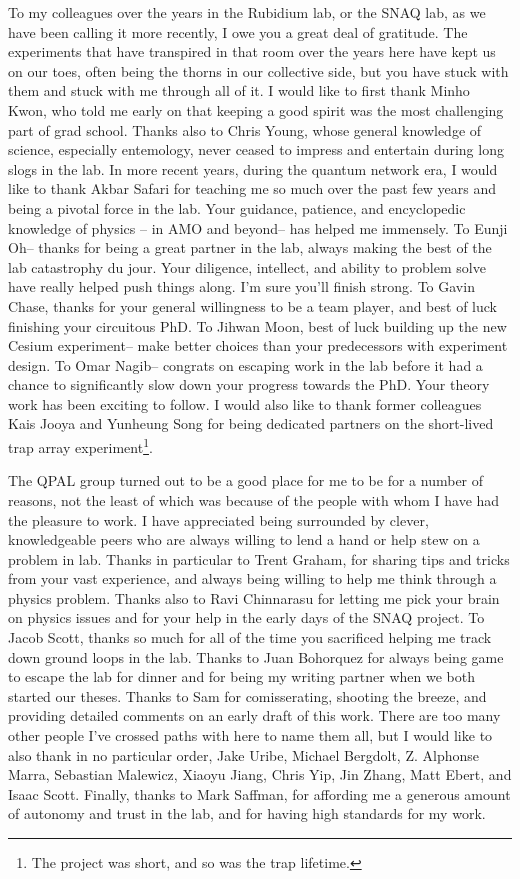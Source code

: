To my colleagues over the years in the Rubidium lab, or the SNAQ lab, as we have been calling it more recently, I owe you a great deal of gratitude. The experiments that have transpired in that room over the years here have kept us on our toes, often being the thorns in our collective side, but you have stuck with them and stuck with me through all of it. I would like to first thank Minho Kwon, who told me early on that keeping a good spirit was the most challenging part of grad school. Thanks also to Chris Young, whose general knowledge of science, especially entemology, never ceased to impress and entertain during long slogs in the lab. In more recent years, during the quantum network era, I would like to thank Akbar Safari for teaching me so much over the past few years and being a pivotal force in the lab. Your guidance, patience, and encyclopedic knowledge of physics -- in AMO and beyond-- has helped me immensely. To Eunji Oh-- thanks for being a great partner in the lab, always making the best of the lab catastrophy du jour. Your diligence, intellect, and ability to problem solve have really helped push things along. I'm sure you'll finish strong. To Gavin Chase, thanks for your general willingness to be a team player, and best of luck finishing your circuitous PhD. To Jihwan Moon, best of luck building up the new Cesium experiment-- make better choices than your predecessors with experiment design. To Omar Nagib-- congrats on escaping work in the lab before it had a chance to significantly slow down your progress towards the PhD. Your theory work has been exciting to follow. I would also like to thank former colleagues Kais Jooya and Yunheung Song for being dedicated partners on the short-lived trap array experiment\footnote{The project was short, and so was the trap lifetime.}.

The QPAL group turned out to be a good place for me to be for a number of reasons, not the least of which was because of the people with whom I have had the pleasure to work. I have appreciated being surrounded by clever, knowledgeable peers who are always willing to lend a hand or help stew on a problem in lab. Thanks in particular to Trent Graham, for sharing tips and tricks from your vast experience, and always being willing to help me think through a physics problem. Thanks also to Ravi Chinnarasu for letting me pick your brain on physics issues and for your help in the early days of the SNAQ project. To Jacob Scott, thanks so much for all of the time you sacrificed helping me track down ground loops in the lab. Thanks to Juan Bohorquez for always being game to escape the lab for dinner and for being my writing partner when we both started our theses. Thanks to Sam for comisserating, shooting the breeze, and providing detailed comments on an early draft of this work. There are too many other people I've crossed paths with here to name them all, but I would like to also thank in no particular order, Jake Uribe, Michael Bergdolt, Z. Alphonse Marra, Sebastian Malewicz, Xiaoyu Jiang, Chris Yip, Jin Zhang, Matt Ebert, and Isaac Scott. Finally, thanks to Mark Saffman, for affording me a generous amount of autonomy and trust in the lab, and for having high standards for my work.

